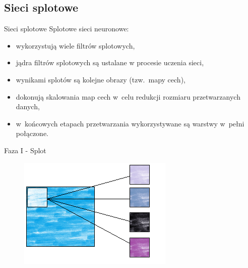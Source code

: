 \documentclass[xcolor=dvipsnames]{beamer}
\begin{document}
\subsection{Sieci splotowe}
\begin{frame}{Sieci splotowe}
    Splotowe sieci neuronowe:
    \begin{itemize}
        \item wykorzystują wiele filtrów splotowych,
        \item jądra filtrów splotowych są ustalane w procesie uczenia sieci,
        \item wynikami splotów są kolejne obrazy (tzw.~mapy cech),
        \item dokonują skalowania map cech w~celu redukcji rozmiaru przetwarzanych danych,
        \item w~końcowych etapach przetwarzania wykorzystywane są warstwy w~pełni połączone.
    \end{itemize}
\end{frame}
\begin{frame}{Faza I - Splot}
	\begin{figure}
		\includegraphics[width=\linewidth, height=0.7\textheight, keepaspectratio] {img/convolution.png}
	\end{figure}
\end{frame}
\end{document}
